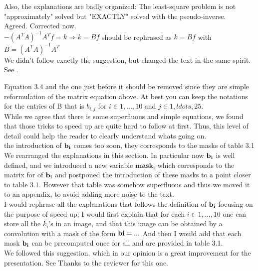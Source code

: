\documentclass[a4paper,10pt]{report}
\begin{document}
Also, the explanations are badly organized:
\que  The least-square problem is not "approximately" solved but "EXACTLY" solved with the pseudo-inverse.\\

\ans Agreed. Corrected now.\\


\que $- (A^TA)^{−1}A^T f=k \Rightarrow k=Bf$ should be rephrased as
$k=Bf$ with $B=(A^TA)^{−1}A^T$\\

\ans We didn't follow exactly the suggestion, but changed the text in the same spirit. See .

\que Equation 3.4 and the one just before it should be removed since they are
simple reformulation of the matrix equation above. At best you can keep the
notations for the entries of B that is $b_{i,j}$ for $i\in {1,\ldots,10}$ and
$j \in {1,ldots,25}$.\\

\ans While we agree that there is some superfluous and simple equations, we found that those tricks to speed up are quite hard to follow at first. Thus, this level of detail could help the reader to clearly understand whats going on.\\

\que the introduction of $\bf{b_i}$ comes too soon, they corresponds to the masks of table 3.1\\

\ans We rearranged the explanations in this section. In particular now $\bf{b_i}$ is well defined, and we introduced a new variable $\mathbf{mask_i}$ which corresponds to the matrix for of $\bf{b_i}$ and postponed the introduction of these masks to a point closer to table 3.1. However that table was somehow superfluous and thus we moved it to an appendix, to avoid adding more noise to the text.\\

\que  I would rephrase all the explanations that follows the definition of $\bf{b_i}$
focusing on the purpose of speed up; I would first explain that for each
$i\in {1,\ldots,10}$ one can store all the $k_i$'s in an image, and that this
image can be obtained by a convolution with a mask of the form $\bf{bi}=...$
And then I would add that each mask $\bf{b_i}$ can be precomputed once for all and are provided in table 3.1.\\

\ans We followed this suggestion, which in our opinion is a great improvement for the presentation. See  Thanks to the reviewer for this one. \\
\end{document}
